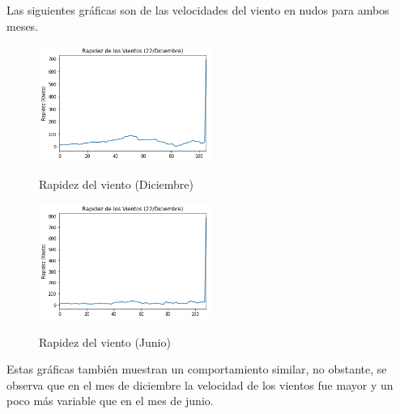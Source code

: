 \documentclass{article}
\begin{document}
Las siguientes gráficas son de las velocidades del viento en nudos para ambos meses.
\begin{figure}[H]
    \caption{Rapidez del viento (Diciembre)}
    \includegraphics[width=0.5\textwidth]{RapidezVientoDic.png}
    \centering
    \label{VIEN}
\end{figure}
\begin{figure}[H]
    \caption{Rapidez del viento (Junio)}
    \includegraphics[width=0.5\textwidth]{RapidezVientoJun.png}
    \centering
    \label{VIEN}
\end{figure}
Estas gráficas también muestran un comportamiento similar, no obstante, se observa que en el mes de diciembre la velocidad de los vientos fue mayor y un poco más variable que en el mes de junio. 
\end{document}
